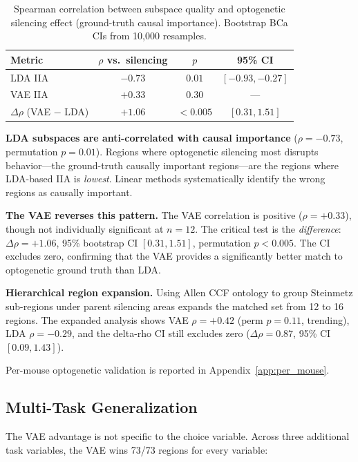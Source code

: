 \documentclass{article}
\begin{document}
\begin{table}[h]
\centering
\small
\caption{Spearman correlation between subspace quality and optogenetic silencing effect (ground-truth causal importance). Bootstrap BCa CIs from 10,000 resamples.}
\label{tab:silencing}
\begin{tabular}{lccc}
\toprule
Metric & $\rho$ vs.\ silencing & $p$ & 95\% CI \\
\midrule
LDA IIA & $-0.73$ & $0.01$ & $[-0.93, -0.27]$ \\
VAE IIA & $+0.33$ & $0.30$ & --- \\
$\Delta\rho$ (VAE $-$ LDA) & $+1.06$ & $< 0.005$ & $[0.31, 1.51]$ \\
\bottomrule
\end{tabular}
\end{table}

\textbf{LDA subspaces are anti-correlated with causal importance} ($\rho = -0.73$, permutation $p = 0.01$). Regions where optogenetic silencing most disrupts behavior---the ground-truth causally important regions---are the regions where LDA-based IIA is \emph{lowest}. Linear methods systematically identify the wrong regions as causally important.

\textbf{The VAE reverses this pattern.} The VAE correlation is positive ($\rho = +0.33$), though not individually significant at $n = 12$. The critical test is the \emph{difference}: $\Delta\rho = +1.06$, 95\% bootstrap CI $[0.31, 1.51]$, permutation $p < 0.005$. The CI excludes zero, confirming that the VAE provides a significantly better match to optogenetic ground truth than LDA.

\textbf{Hierarchical region expansion.} Using Allen CCF ontology to group Steinmetz sub-regions under parent silencing areas expands the matched set from 12 to 16 regions. The expanded analysis shows VAE $\rho = +0.42$ (perm $p = 0.11$, trending), LDA $\rho = -0.29$, and the delta-rho CI still excludes zero ($\Delta\rho = 0.87$, 95\% CI $[0.09, 1.43]$).

Per-mouse optogenetic validation is reported in Appendix~\ref{app:per_mouse}.

\subsection{Multi-Task Generalization}

The VAE advantage is not specific to the choice variable. Across three additional task variables, the VAE wins 73/73 regions for every variable:
\end{document}

